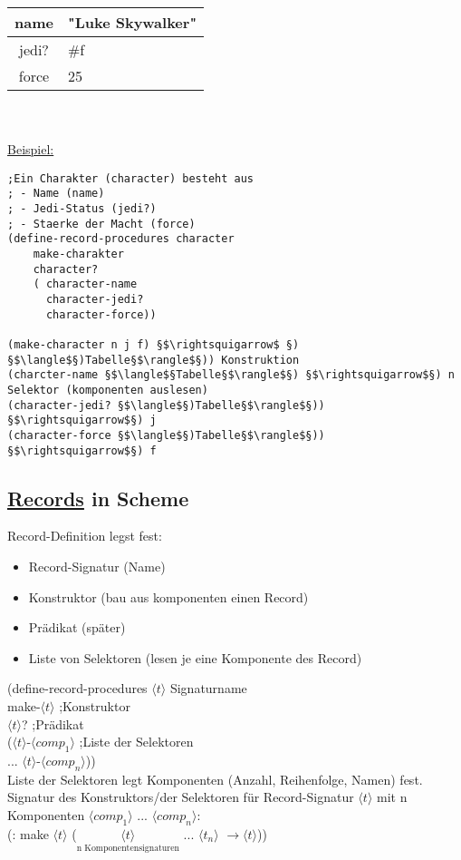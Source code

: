 \documentclass[a4paper,12pt]{article}
\begin{document}
\begin{tabular}{|c|l|}
\hline
name & "Luke Skywalker"\\
\hline
jedi? & \#f\\
\hline
force & 25\\
\hline
\end{tabular}
\\\\
\uline{Beispiel:}
\begin{lstlisting}[style=customc]
;Ein Charakter (character) besteht aus
; - Name (name)
; - Jedi-Status (jedi?)
; - Staerke der Macht (force)
(define-record-procedures character
	make-charakter
	character?
	( character-name
	  character-jedi?
	  character-force))
	  
(make-character n j f) §$\rightsquigarrow$ §) §$\langle$§)Tabelle§$\rangle$§)) Konstruktion
(charcter-name §$\langle$§Tabelle§$\rangle$§) §$\rightsquigarrow$§) n Selektor (komponenten auslesen)
(character-jedi? §$\langle$§)Tabelle§$\rangle$§)) §$\rightsquigarrow$§) j
(character-force §$\langle$§)Tabelle§$\rangle$§)) §$\rightsquigarrow$§) f
\end{lstlisting}
\subsection{\uline{Records} in Scheme}
Record-Definition legst fest:
\begin{itemize}
\item Record-Signatur (Name)
\item Konstruktor 		(bau aus komponenten einen Record)
\item Prädikat 			(später)
\item Liste von Selektoren (lesen je eine Komponente des Record)
\end{itemize}
(define-record-procedures $\langle t\rangle$        Signaturname\\
	make-$\langle t \rangle$                        ;Konstruktor\\
	$\langle t \rangle$? 							;Prädikat\\
	($\langle t \rangle$-$\langle comp_1 \rangle$   ;Liste der Selektoren\\
	 ...
	 $\langle t \rangle$-$\langle comp_n \rangle$))\\
Liste der Selektoren legt Komponenten (Anzahl, Reihenfolge, Namen) fest.
Signatur des Konstruktors/der Selektoren für Record-Signatur $\langle t \rangle$ mit n Komponenten $\langle comp_1\rangle$ ...  $\langle comp_n\rangle$:\\
(: make $\langle t \rangle$ ($\underset{\text{n Komponentensignaturen}}{\langle t \rangle}$ ... $\langle t_n \rangle$ $\rightarrow \langle t \rangle $))\\
\end{document}
